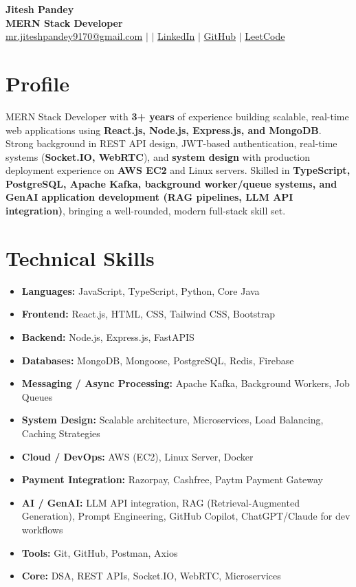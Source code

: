 \documentclass[letterpaper,10pt]{article}
\begin{document}
\begin{center}
    {\LARGE \textbf{Jitesh Pandey}} \\[2pt]
    {\small \textbf{MERN Stack Developer}} \\[4pt]
    \small
    \href{mailto:mr.jiteshpandey9170@gmail.com}{mr.jiteshpandey9170@gmail.com} \quad$|$ \quad$|$\quad
    \href{https://www.linkedin.com/in/mr-jitesh9170/}{LinkedIn} \quad$|$\quad
    \href{https://github.com/Mr-Jitesh9170}{GitHub} \quad$|$\quad
    \href{https://leetcode.com/u/Mr-Jitesh9170/}{LeetCode}
\end{center}

\vspace{-2pt}

\section{Profile}
\small
MERN Stack Developer with \textbf{3+ years} of experience building scalable, real-time web applications using \textbf{React.js, Node.js, Express.js, and MongoDB}. Strong background in REST API design, JWT-based authentication, real-time systems (\textbf{Socket.IO, WebRTC}), and \textbf{system design} with production deployment experience on \textbf{AWS EC2} and Linux servers. Skilled in \textbf{TypeScript, PostgreSQL, Apache Kafka, background worker/queue systems, and GenAI application development (RAG pipelines, LLM API integration)}, bringing a well-rounded, modern full-stack skill set.

\section{Technical Skills}
\small
\begin{itemize}
\item \textbf{Languages:} JavaScript, TypeScript, Python, Core Java
\item \textbf{Frontend:} React.js, HTML, CSS, Tailwind CSS, Bootstrap
\item \textbf{Backend:} Node.js, Express.js, FastAPIS
\item \textbf{Databases:} MongoDB, Mongoose, PostgreSQL, Redis, Firebase
\item \textbf{Messaging / Async Processing:} Apache Kafka, Background Workers, Job Queues
\item \textbf{System Design:} Scalable architecture, Microservices, Load Balancing, Caching Strategies
\item \textbf{Cloud / DevOps:} AWS (EC2), Linux Server, Docker
\item \textbf{Payment Integration:} Razorpay, Cashfree, Paytm Payment Gateway
\item \textbf{AI / GenAI:} LLM API integration, RAG (Retrieval-Augmented Generation), Prompt Engineering, GitHub Copilot, ChatGPT/Claude for dev workflows
\item \textbf{Tools:} Git, GitHub, Postman, Axios
\item \textbf{Core:} DSA, REST APIs, Socket.IO, WebRTC, Microservices
\end{itemize}
\end{document}
